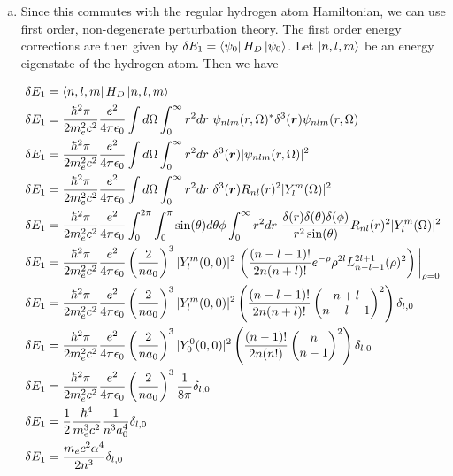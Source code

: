 \documentclass[]{article}
\begin{document}
\begin{enumerate}[1)]
\begin{enumerate}[a)]

\item Since this commutes with the regular hydrogen atom Hamiltonian, we can use first order, non-degenerate perturbation theory. The first order energy corrections are then given by $\delta E_1 = \bra{\psi_0} H_D \ket{\psi_0}$. Let $\ket{n, l, m} $ be an energy eigenstate of the hydrogen atom. Then we have

\begin{equation}
\begin{split}
\delta E_1 & = \bra{n, l, m} H_D \ket{n, l, m}  \\
\delta E_1 & =  \frac{\hbar^2\pi}{2m_e^2c^2} \frac{e^2}{4\pi \epsilon_0}  \int d\Omega \int_{0}^{\infty}r^2dr \text{ }  \psi_{nlm}(r,\Omega)^* \delta^3(\bm{r}) \psi_{nlm}(r,\Omega) \\
\delta E_1 & =  \frac{\hbar^2\pi}{2m_e^2c^2} \frac{e^2}{4\pi \epsilon_0}  \int d\Omega \int_{0}^{\infty}r^2dr \text{ } \delta^3(\bm{r}) |\psi_{nlm}(r,\Omega)|^2   \\
\delta E_1 & =  \frac{\hbar^2\pi}{2m_e^2c^2} \frac{e^2}{4\pi \epsilon_0}  \int d\Omega \int_{0}^{\infty}r^2dr \text{ } \delta^3(\bm{r}) R_{nl}(r)^2  | Y_l^m (\Omega)|^2  \\
\delta E_1 & =  \frac{\hbar^2\pi}{2m_e^2c^2} \frac{e^2}{4\pi \epsilon_0}  \int_0^{2\pi} \int_0^{\pi} \sin(\theta)d\theta\phi \int_{0}^{\infty}r^2dr \text{ } \frac{ \delta(r) \delta(\theta)  \delta(\phi)   }{r^2 \sin(\theta)} R_{nl}(r)^2  | Y_l^m (\Omega)|^2  \\
\delta E_1 & =  \frac{\hbar^2\pi}{2m_e^2c^2} \frac{e^2}{4\pi \epsilon_0} \left(\frac{2}{na_0} \right)^3  | Y_l^m (0,0)|^2  \eval{ \left( \frac{ (n-l-1)!  }{2n(n+l)!}  e^{-\rho} \rho^{2l} L_{n-l-1}^{2l+1}(\rho)^2     \right) }_{\rho=0} \\
\delta E_1 & =  \frac{\hbar^2\pi}{2m_e^2c^2} \frac{e^2}{4\pi \epsilon_0} \left(\frac{2}{na_0} \right)^3  | Y_l^m (0,0)|^2  \left( \frac{ (n-l-1)!  }{2n(n+l)!}  \left(  \mqty{ n+l \\ n-l-1 }  \right)^2 \right) \delta_{l,0} \\
\delta E_1 & =  \frac{\hbar^2\pi}{2m_e^2c^2} \frac{e^2}{4\pi \epsilon_0} \left(\frac{2}{na_0} \right)^3  | Y_0^0 (0,0)|^2  \left( \frac{ (n-1)!  }{2n(n!)}  \left(  \mqty{ n \\ n-1 }  \right)^2 \right) \delta_{l,0} \\
\delta E_1 & =  \frac{\hbar^2\pi}{2m_e^2c^2} \frac{e^2}{4\pi \epsilon_0} \left(\frac{2}{na_0} \right)^3    \frac{ 1  }{8\pi}   \delta_{l,0} \\
\delta E_1 & =  \frac{1}{2}\frac{\hbar^4}{m_e^3 c^2} \frac{1}{n^3a_0^4}   \delta_{l,0} \\
\delta E_1 & =  \frac{m_e c^2 \alpha^4}{2n^3}  \delta_{l,0} \\
\end{split}
\end{equation}




\end{enumerate}
\end{enumerate}
\end{document}
